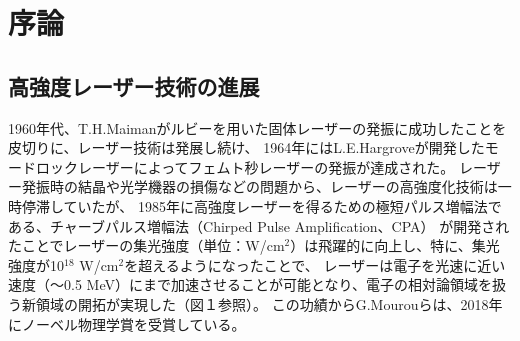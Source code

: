 \documentclass[a4paper,11pt,titlepage]{jsarticle}
\begin{document}
  \section{序論}
  \subsection{高強度レーザー技術の進展}

  1960年代、T.H.Maimanがルビーを用いた固体レーザーの発振に成功した\cite{ft1}ことを皮切りに、レーザー技術は発展し続け、
  1964年にはL.E.Hargroveが開発したモードロックレーザーによってフェムト秒レーザーの発振が達成された\cite{ft2}。
  レーザー発振時の結晶や光学機器の損傷などの問題から、レーザーの高強度化技術は一時停滞していたが、
  1985年に高強度レーザーを得るための極短パルス増幅法である、チャーブパルス増幅法（Chirped Pulse Amplification、CPA）\cite{ft3}
  が開発されたことでレーザーの集光強度（単位：W/cm$^{2}$）は飛躍的に向上し、特に、集光強度が10$^{18}$ W/cm$^{2}$を超えるようになったことで、
  レーザーは電子を光速に近い速度（～0.5 MeV）にまで加速させることが可能となり、電子の相対論領域を扱う新領域の開拓が実現した（図１参照）。
  この功績からG.Mourouらは、2018年にノーベル物理学賞を受賞している。

  \begin{table}[H]
    \caption{レーザーの一覧}
    \centering
  \end{table}
\end{document}
